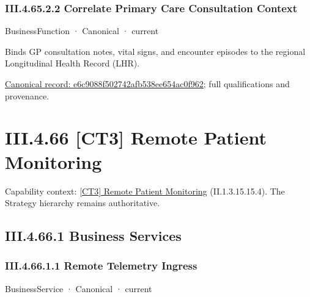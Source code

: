 \subsubsection*{III.4.65.2.2 Correlate Primary Care Consultation Context}
\label{navigation:III.4.65.2.2}

\label{element:e6c9088f502742afb538ee654ac0f962}
{\small BusinessFunction · Canonical · current}\par

Binds GP consultation notes, vital signs, and encounter episodes to the regional Longitudinal Health Record (LHR).


{\footnotesize \href{../../../../continuum/business/business-function/e6c9088f502742afb538ee654ac0f962.md}{Canonical record: e6c9088f502742afb538ee654ac0f962}; full qualifications and provenance.}\par
\section*{III.4.66 [CT3] Remote Patient Monitoring}
\label{navigation:III.4.66}

{\small Capability context: \hyperref[element:2d1addc7dd1d4821b71a11c692d35b27]{[CT3] Remote Patient Monitoring} (II.1.3.15.15.4). The Strategy hierarchy remains authoritative.}\par
\subsection*{III.4.66.1 Business Services}
\label{navigation:III.4.66.1}

\subsubsection*{III.4.66.1.1 Remote Telemetry Ingress}
\label{navigation:III.4.66.1.1}

\label{element:89014429b6454ced82c26cbe777fa33a}
{\small BusinessService · Canonical · current}\par

